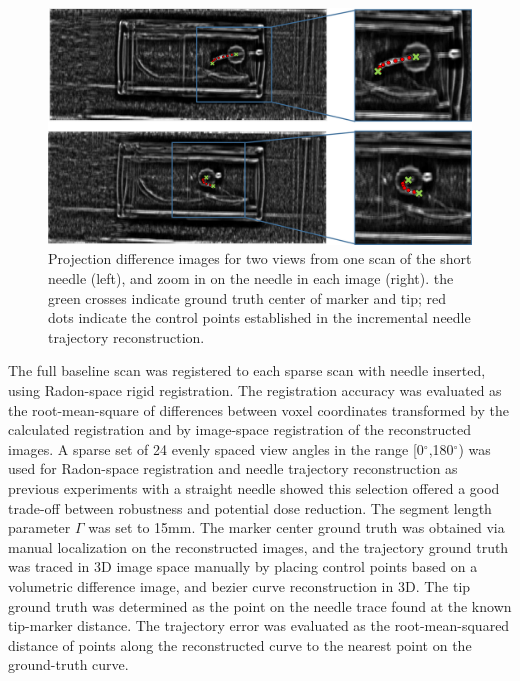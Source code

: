 




\begin{figure}[b]
\centering
\includegraphics[width=\textwidth]{projection_diff_images.png}
\caption{\small{Projection difference images for two views from one scan of the short needle (left), and zoom in on the needle in each image (right). the green crosses indicate ground truth center of marker and tip; red dots indicate the control points established in the incremental needle trajectory reconstruction.}}
\label{proj_diff_fig}
\end{figure}

The full baseline scan was registered to each sparse scan with needle inserted, using Radon-space rigid registration. The registration accuracy was evaluated as the root-mean-square of differences between voxel coordinates transformed by the calculated registration and by image-space registration of the reconstructed images. 
A sparse set of 24 evenly spaced view angles in the range [0$^\circ$,180$^\circ$) was used for Radon-space registration and needle trajectory reconstruction as previous experiments \cite{medan2017reduced} with a straight needle showed this selection offered a good trade-off between robustness and potential dose reduction. The segment length parameter $\Gamma$ was set to 15mm.
The marker center ground truth was obtained via manual localization on the reconstructed images, and the trajectory ground truth was traced in 3D image space manually by placing control points based on a volumetric difference image, and bezier curve reconstruction in 3D. The tip ground truth was determined as the point on the needle trace found at the known tip-marker distance. The trajectory error was evaluated as the root-mean-squared distance of points along the reconstructed curve to the nearest point on the ground-truth curve.

